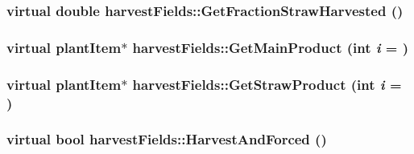\label{classharvest_fields_adc76919fe377000c2c48276227cfd6ca}
\hypertarget{classharvest_fields_ab9cb28e116628fc463de8eb6c39baf0a}{
\subsubsection[{GetFractionStrawHarvested}]{\setlength{\rightskip}{0pt plus 5cm}virtual double harvestFields::GetFractionStrawHarvested ()}}
\label{classharvest_fields_ab9cb28e116628fc463de8eb6c39baf0a}
\hypertarget{classharvest_fields_a20e16c680ffd74dbf3a06c3dfe94a85f}{
\subsubsection[{GetMainProduct}]{\setlength{\rightskip}{0pt plus 5cm}virtual {\bf plantItem}$\ast$ harvestFields::GetMainProduct (int {\em i} = {})}}
\label{classharvest_fields_a20e16c680ffd74dbf3a06c3dfe94a85f}
\hypertarget{classharvest_fields_ac4aae2b6cd458df8e64f859776e672ff}{
\subsubsection[{GetStrawProduct}]{\setlength{\rightskip}{0pt plus 5cm}virtual {\bf plantItem}$\ast$ harvestFields::GetStrawProduct (int {\em i} = {})}}
\label{classharvest_fields_ac4aae2b6cd458df8e64f859776e672ff}
\hypertarget{classharvest_fields_a3928ef45dc41fa069fcde4ff23f69d54}{
\subsubsection[{HarvestAndForced}]{\setlength{\rightskip}{0pt plus 5cm}virtual bool harvestFields::HarvestAndForced ()}}
\label{classharvest_fields_a3928ef45dc41fa069fcde4ff23f69d54}


